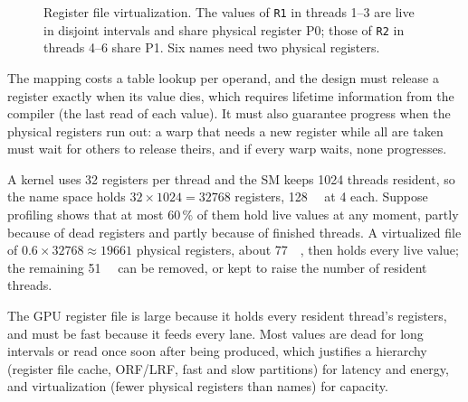 \documentclass[../main.tex]{subfiles}
\begin{document}
\begin{figure}[tb]
  \centering
  
  \caption{Register file virtualization.  The values of \texttt{R1} in
    threads 1--3 are live in disjoint intervals and share physical
    register P0; those of \texttt{R2} in threads 4--6 share P1.  Six
    names need two physical registers.}
  \label{fig:l06-rf-virtualization}
\end{figure}

%
The mapping costs a table lookup per operand, and the design must
release a register exactly when its value dies, which requires lifetime
information from the compiler (the last read of each value).  It must
also guarantee progress when the physical registers run out: a warp
that needs a new register while all are taken must wait for others to
release theirs, and if every warp waits, none progresses.

\begin{example}
  \label{ex:l06-rf-virtualization}
  A kernel uses 32 registers per thread and the SM keeps 1024 threads
  resident, so the name space holds $32 \times 1024 = \num{32768}$
  registers, \SI{128}{\kibi\byte} at \SI{4}{\byte} each.  Suppose
  profiling shows that at most 60\,\% of them hold live values at any
  moment, partly because of dead registers and partly because of
  finished threads.  A virtualized file of
  $0.6 \times \num{32768} \approx \num{19661}$ physical registers,
  about \SI{77}{\kibi\byte}, then holds every live value; the remaining
  \SI{51}{\kibi\byte} can be removed, or kept to raise the number of
  resident threads.
\end{example}

\begin{keypoint}
  The GPU register file is large because it holds every resident
  thread's registers, and must be fast because it feeds every lane.
  Most values are dead for long intervals or read once soon after
  being produced, which justifies a hierarchy (register file cache,
  ORF/LRF, fast and slow partitions) for latency and energy, and
  virtualization (fewer physical registers than names) for capacity.
\end{keypoint}
\end{document}
